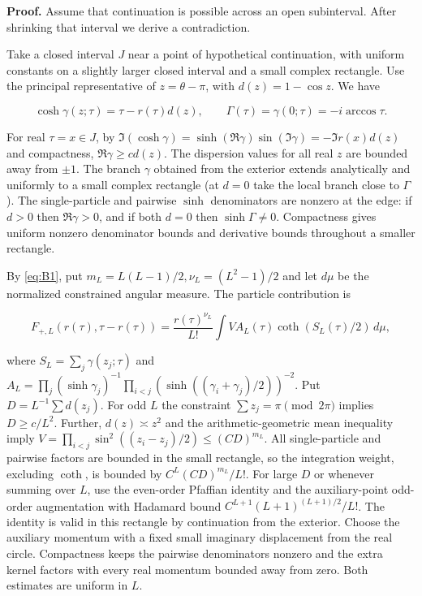 \documentclass[11pt,a4paper]{article}
\numberwithin{equation}{section}
\theoremstyle{plain}
\theoremstyle{definition}
\begin{document}
\textbf{Proof.} Assume that continuation is possible across an open subinterval. After shrinking that interval we derive a contradiction.

Take a closed interval \(J\) near a point of hypothetical continuation, with uniform constants on a slightly larger closed interval and a small complex rectangle. Use the principal representative of \(z=\theta-\pi\), with \(d(z)=1-\cos z\). We have

\[\cosh\gamma(z;\tau)=\tau-r(\tau)d(z),\qquad \Gamma(\tau)=\gamma(0;\tau)=-i\arccos\tau.\]

For real \(\tau=x\in J\), by \(\Im(\cosh\gamma)=\sinh(\Re\gamma)\sin(\Im\gamma)=-\Im r(x)d(z)\) and compactness, \(\Re\gamma\ge c d(z)\). The dispersion values for all real \(z\) are bounded away from \(\pm1\). The branch \(\gamma\) obtained from the exterior extends analytically and uniformly to a small complex rectangle (at \(d=0\) take the local branch close to \(\Gamma\)). The single-particle and pairwise \(\sinh\) denominators are nonzero at the edge: if \(d>0\) then \(\Re\gamma>0\), and if both \(d=0\) then \(\sinh\Gamma\ne0\). Compactness gives uniform nonzero denominator bounds and derivative bounds throughout a smaller rectangle.

By \eqref{eq:B1}, put \(m_L=L(L-1)/2,\nu_L=(L^2-1)/2\) and let \(d\mu\) be the normalized constrained angular measure. The particle contribution is

\[F_{+,L}(r(\tau),\tau-r(\tau))=\frac{r(\tau)^{\nu_L}}{L!}\int V A_L(\tau)\coth(S_L(\tau)/2)\,d\mu,\]

where \(S_L=\sum_j\gamma(z_j;\tau)\) and \(A_L=\prod_j(\sinh\gamma_j)^{-1}\prod_{i<j}(\sinh((\gamma_i+\gamma_j)/2))^{-2}\). Put \(D=L^{-1}\sum d(z_j)\). For odd \(L\) the constraint \(\sum z_j=\pi\pmod{2\pi}\) implies \(D\ge c/L^2\). Further, \(d(z)\asymp z^2\) and the arithmetic-geometric mean inequality imply \(V=\prod_{i<j}\sin^2((z_i-z_j)/2)\le(C D)^{m_L}\). All single-particle and pairwise factors are bounded in the small rectangle, so the integration weight, excluding \(\coth\), is bounded by \(C^L (C D)^{m_L}/L!\). For large \(D\) or whenever summing over \(L\), use the even-order Pfaffian identity and the auxiliary-point odd-order augmentation with Hadamard bound \(C^{L+1}(L+1)^{(L+1)/2}/L!\). The identity is valid in this rectangle by continuation from the exterior. Choose the auxiliary momentum with a fixed small imaginary displacement from the real circle. Compactness keeps the pairwise denominators nonzero and the extra kernel factors with every real momentum bounded away from zero. Both estimates are uniform in \(L\).
\end{document}

